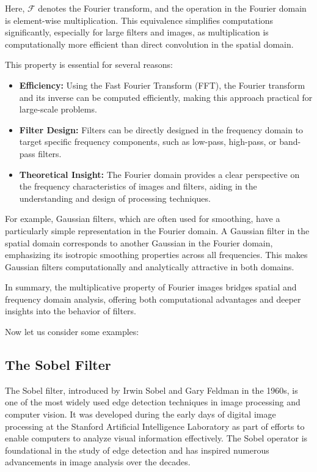 \documentclass[11pt]{book}
\begin{document}
Here, $\mathcal{F}$ denotes the Fourier transform, and the operation in the Fourier domain is element-wise multiplication. This equivalence simplifies computations significantly, especially for large filters and images, as multiplication is computationally more efficient than direct convolution in the spatial domain.

This property is essential for several reasons:
\begin{itemize}
    \item \textbf{Efficiency:} Using the Fast Fourier Transform (FFT), the Fourier transform and its inverse can be computed efficiently, making this approach practical for large-scale problems.
    \item \textbf{Filter Design:} Filters can be directly designed in the frequency domain to target specific frequency components, such as low-pass, high-pass, or band-pass filters.
    \item \textbf{Theoretical Insight:} The Fourier domain provides a clear perspective on the frequency characteristics of images and filters, aiding in the understanding and design of processing techniques.
\end{itemize}

For example, Gaussian filters, which are often used for smoothing, have a particularly simple representation in the Fourier domain. A Gaussian filter in the spatial domain corresponds to another Gaussian in the Fourier domain, emphasizing its isotropic smoothing properties across all frequencies. This makes Gaussian filters computationally and analytically attractive in both domains.

In summary, the multiplicative property of Fourier images bridges spatial and frequency domain analysis, offering both computational advantages and deeper insights into the behavior of filters.

Now let us consider some examples:

\subsection{The Sobel Filter}

The Sobel filter, introduced by Irwin Sobel and Gary Feldman in the 1960s, is one of the most widely used edge detection techniques in image processing and computer vision. It was developed during the early days of digital image processing at the Stanford Artificial Intelligence Laboratory as part of efforts to enable computers to analyze visual information effectively. The Sobel operator is foundational in the study of edge detection and has inspired numerous advancements in image analysis over the decades.
\end{document}
